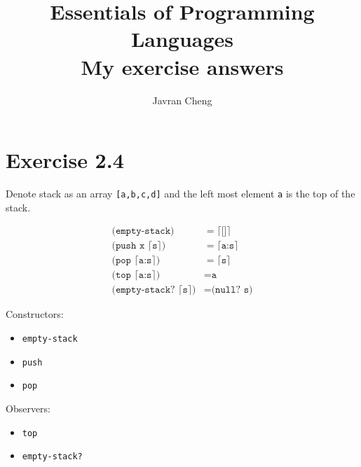 \documentclass[11pt,a4paper]{article}
\title{Essentials of Programming Languages\\
{\large
My exercise answers}}
\author{Javran Cheng}
\begin{document}
\maketitle

\section{Exercise 2.4}

Denote stack as an array \texttt{[a,b,c,d]} and the left most element \texttt{a}
is the top of the stack.

\begin{align*}
    \texttt{(empty-stack)} &= \lceil \texttt{[]}\rceil \\
    \texttt{(push x }\lceil \texttt{s} \rceil \texttt{)}
        &= \lceil \texttt{a:s} \rceil \\
    \texttt{(pop } \lceil \texttt{a:s} \rceil \texttt{)}
        &= \lceil \texttt{s} \rceil \\
    \texttt{(top } \lceil \texttt{a:s} \rceil \texttt{)}
        &= \texttt{a} \\
    \texttt{(empty-stack? } \lceil \texttt{s} \rceil \texttt{)}
        &= \texttt{(null? s)}
\end{align*}

Constructors:

\begin{itemize}
    \item\texttt{empty-stack}
    \item\texttt{push}
    \item\texttt{pop}
\end{itemize}

Observers:

\begin{itemize}
    \item\texttt{top}
    \item\texttt{empty-stack?}
\end{itemize}
\end{document}
